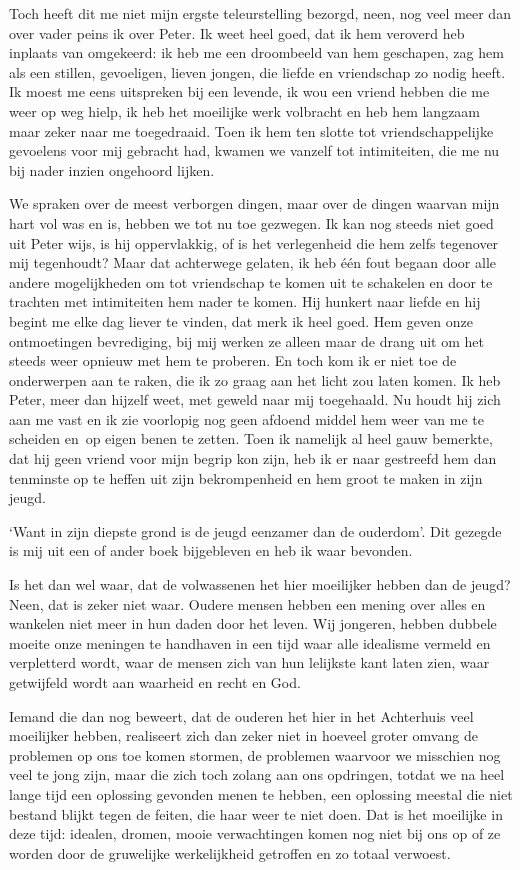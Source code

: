 \documentclass{book}
\begin{document}
Toch heeft dit me niet mijn ergste teleurstelling bezorgd, neen, nog
veel meer dan over vader peins ik over Peter. Ik weet heel goed, dat ik
hem veroverd heb inplaats van omgekeerd: ik heb me een droombeeld van
hem geschapen, zag hem als een stillen, gevoeligen, lieven jongen, die
liefde en vriendschap zo nodig heeft. Ik moest me eens uitspreken bij
een levende, ik wou een vriend hebben die me weer op weg hielp, ik heb
het moeilijke werk volbracht en heb hem langzaam maar zeker naar me
toegedraaid. Toen ik hem ten slotte tot vriendschappelijke gevoelens
voor mij gebracht had, kwamen we vanzelf tot intimiteiten, die me nu bij
nader inzien ongehoord lijken.

We spraken over de meest verborgen dingen, maar over de dingen waarvan
mijn hart vol was en is, hebben we tot nu toe gezwegen. Ik kan nog
steeds niet goed uit Peter wijs, is hij oppervlakkig, of is het
verlegenheid die hem zelfs tegenover mij tegenhoudt? Maar dat achterwege
gelaten, ik heb één fout begaan door alle andere mogelijkheden om tot
vriendschap te komen uit te schakelen en door te trachten met
intimiteiten hem nader te komen. Hij hunkert naar liefde en hij begint
me elke dag liever te vinden, dat merk ik heel goed. Hem geven onze
ontmoetingen bevrediging, bij mij werken ze alleen maar de drang uit om
het steeds weer opnieuw met hem te proberen. En toch kom ik er niet toe
de onderwerpen aan te raken, die ik zo graag aan het licht zou laten
komen. Ik heb Peter, meer dan hijzelf weet, met geweld naar mij
toegehaald. Nu houdt hij zich aan me vast en ik zie voorlopig nog geen
afdoend middel hem weer van me te scheiden en~op eigen benen te zetten.
Toen ik namelijk al heel gauw bemerkte, dat hij geen vriend voor mijn
begrip kon zijn, heb ik er naar gestreefd hem dan tenminste op te heffen
uit zijn bekrompenheid en hem groot te maken in zijn jeugd.

`Want in zijn diepste grond is de jeugd eenzamer dan de ouderdom'. Dit
gezegde is mij uit een of ander boek bijgebleven en heb ik waar
bevonden.

Is het dan wel waar, dat de volwassenen het hier moeilijker hebben dan
de jeugd? Neen, dat is zeker niet waar. Oudere mensen hebben een mening
over alles en wankelen niet meer in hun daden door het leven. Wij
jongeren, hebben dubbele moeite onze meningen te handhaven in een tijd
waar alle idealisme vermeld en verpletterd wordt, waar de mensen zich
van hun lelijkste kant laten zien, waar getwijfeld wordt aan waarheid en
recht en God.

Iemand die dan nog beweert, dat de ouderen het hier in het Achterhuis
veel moeilijker hebben, realiseert zich dan zeker niet in hoeveel groter
omvang de problemen op ons toe komen stormen, de problemen waarvoor we
misschien nog veel te jong zijn, maar die zich toch zolang aan ons
opdringen, totdat we na heel lange tijd een oplossing gevonden menen te
hebben, een oplossing meestal die niet bestand blijkt tegen de feiten,
die haar weer te niet doen. Dat is het moeilijke in deze tijd: idealen,
dromen, mooie verwachtingen komen nog niet bij ons op of ze worden door
de gruwelijke werkelijkheid getroffen en zo totaal verwoest.
\end{document}
